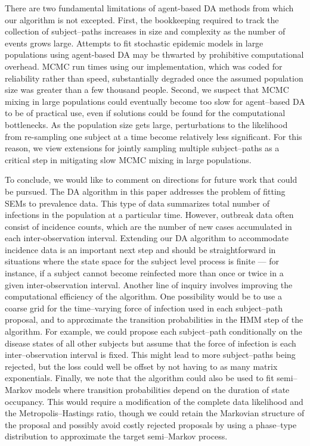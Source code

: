 There are two fundamental limitations of agent-based DA methods from which our algorithm is not excepted. First, the bookkeeping required to track the collection of subject--paths increases in size and complexity as the number of events grows large. Attempts to fit stochastic epidemic models in large populations using agent-based DA may be thwarted by prohibitive computational overhead. MCMC run times using our implementation, which was coded for reliability rather than speed, substantially degraded once the assumed population size was greater than a few thousand people. Second, we suspect that MCMC mixing in large populations could eventually become too slow for agent--based DA to be of practical use, even if solutions could be found for the computational bottlenecks. As the population size gets large, perturbations to the likelihood from re-sampling one subject at a time become relatively less significant. For this reason, we view extensions for jointly sampling multiple subject--paths as a critical step in mitigating slow MCMC mixing in large populations.

To conclude, we would like to comment on directions for future work that could be pursued. The DA algorithm in this paper addresses the problem of fitting SEMs to prevalence data. This type of data summarizes total number of infections in the population at a particular time. However, outbreak data often consist of incidence counts, which are the number of new cases accumulated in each inter-observation interval. Extending our DA algorithm to accommodate incidence data is an important next step and should be straightforward in situations where the state space for the subject level process is finite --- for instance, if a subject cannot become reinfected more than once or twice in a given inter-observation interval. Another line of inquiry involves improving the computational efficiency of the algorithm. One possibility would be to use a coarse grid for the time--varying force of infection used in each subject--path proposal, and to approximate the transition probabilities in the HMM step of the algorithm. For example, we could propose each subject--path conditionally on the disease states of all other subjects but assume that the force of infection is each inter--observation interval is fixed. This might lead to more subject--paths being rejected, but the loss could well be offset by not having to as many matrix exponentials. Finally, we note that the algorithm could also be used to fit semi--Markov models where transition probabilities depend on the duration of state occupancy. This would require a modification of the complete data likelihood and the Metropolis--Hastings ratio, though we could retain the Markovian structure of the proposal and possibly avoid costly rejected proposals by using a phase--type distribution to approximate the target semi--Markov process.